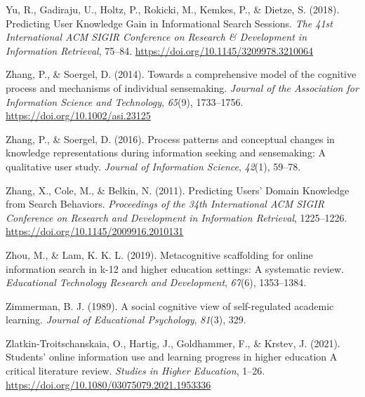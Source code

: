 \documentclass[letterpaper, nobind]{templates/ociamthesis}
\newlength{\cslhangindent}
\newenvironment{CSLReferences}[2] %
 {%
  \setlength{\parindent}{0pt}
  \ifodd #1
  \let\oldpar\par
  \def\par{\hangindent=\cslhangindent\oldpar}
  \fi
  \setlength{\parskip}{1mm}
  \setlength{\baselineskip}{6mm}
 }%
 {}
\begin{document}
\begin{CSLReferences}{1}{0}
\leavevmode{}%
Yu, R., Gadiraju, U., Holtz, P., Rokicki, M., Kemkes, P., \& Dietze, S. (2018). Predicting {User Knowledge Gain} in {Informational Search Sessions}. \emph{The 41st {International ACM SIGIR Conference} on {Research} \& {Development} in {Information Retrieval}}, 75--84. \url{https://doi.org/10.1145/3209978.3210064}

\leavevmode{}%
Zhang, P., \& Soergel, D. (2014). Towards a comprehensive model of the cognitive process and mechanisms of individual sensemaking. \emph{Journal of the Association for Information Science and Technology}, \emph{65}(9), 1733--1756. \url{https://doi.org/10.1002/asi.23125}

\leavevmode{}%
Zhang, P., \& Soergel, D. (2016). Process patterns and conceptual changes in knowledge representations during information seeking and sensemaking: A qualitative user study. \emph{Journal of Information Science}, \emph{42}(1), 59--78.

\leavevmode{}%
Zhang, X., Cole, M., \& Belkin, N. (2011). Predicting {Users}' {Domain Knowledge} from {Search Behaviors}. \emph{Proceedings of the 34th {International ACM SIGIR Conference} on {Research} and {Development} in {Information Retrieval}}, 1225--1226. \url{https://doi.org/10.1145/2009916.2010131}

\leavevmode{}%
Zhou, M., \& Lam, K. K. L. (2019). Metacognitive scaffolding for online information search in k-12 and higher education settings: A systematic review. \emph{Educational Technology Research and Development}, \emph{67}(6), 1353--1384.

\leavevmode{}%
Zimmerman, B. J. (1989). A social cognitive view of self-regulated academic learning. \emph{Journal of Educational Psychology}, \emph{81}(3), 329.

\leavevmode{}%
Zlatkin-Troitschanskaia, O., Hartig, J., Goldhammer, F., \& Krstev, J. (2021). Students' online information use and learning progress in higher education \textendash{} {A} critical literature review. \emph{Studies in Higher Education}, 1--26. \url{https://doi.org/10.1080/03075079.2021.1953336}

\end{CSLReferences}

\end{document}
